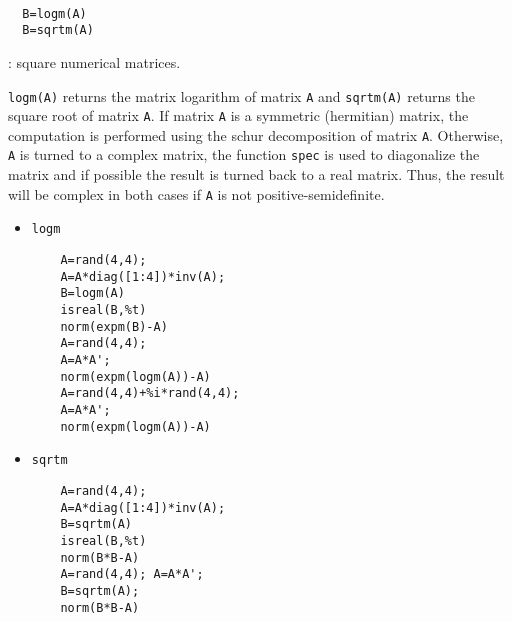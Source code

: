 \begin{mandesc}
   \\ %
\end{mandesc}
\begin{calling_sequence}
\begin{verbatim}
  B=logm(A)  
  B=sqrtm(A)  
\end{verbatim}
\end{calling_sequence}
\begin{parameters}
  \begin{varlist}
    : square numerical matrices.
  \end{varlist}
\end{parameters}
\begin{mandescription}
  \verb!logm(A)! returns the matrix logarithm of matrix \verb!A! and 
  \verb!sqrtm(A)! returns the square root of matrix \verb!A!. 
  If matrix \verb!A! is a symmetric (hermitian) matrix, the 
  computation is performed using the schur decomposition of matrix \verb!A!.
  Otherwise, \verb!A! is turned to a complex matrix, the function 
  \verb!spec! is used to diagonalize the matrix and if possible 
  the result is turned back to a real matrix. Thus, the result will be 
  complex in both cases  if \verb!A! is not positive-semidefinite.
\end{mandescription}
\begin{examples}
\begin{itemize}
  \item \verb!logm!
  \begin{Verbatim}
    A=rand(4,4); 
    A=A*diag([1:4])*inv(A);
    B=logm(A)
    isreal(B,%t)
    norm(expm(B)-A)
    A=rand(4,4);
    A=A*A';
    norm(expm(logm(A))-A)
    A=rand(4,4)+%i*rand(4,4);
    A=A*A';
    norm(expm(logm(A))-A)
  \end{Verbatim}
  \item \verb!sqrtm!
  \begin{Verbatim}
    A=rand(4,4); 
    A=A*diag([1:4])*inv(A);
    B=sqrtm(A)
    isreal(B,%t)
    norm(B*B-A)
    A=rand(4,4); A=A*A';
    B=sqrtm(A);
    norm(B*B-A)
  \end{Verbatim}
\end{itemize}
\end{examples}
\begin{manseealso}
       
\end{manseealso}
